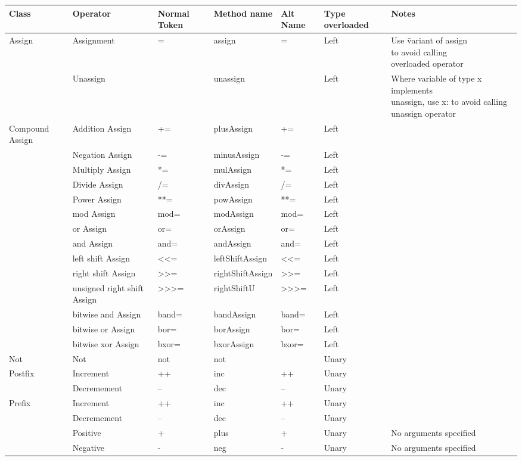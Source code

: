 \documentclass[conc-doc]{subfiles}
\begin{document}
{\tiny
	\begin{longtable}[hbt!]{| l | l | l | l | l | l | l | }
		
		\hline
		Class&Operator&Normal Token&Method name&Alt Name&Type overloaded&Notes\\
		\hline
		\endhead
		
		
		\hline
		
		\endfoot
		Assign&Assignment&=&assign&=&Left&\bettershortstack{Use \= variant of assign\\to avoid calling\\overloaded operator}\\
		&Unassign& &unassign& &Left&\bettershortstack{Where variable of type x implements\\ unassign, use x: to avoid calling unassign operator}\\ \hline
		Compound Assign&Addition Assign&+=&plusAssign&+=&Left&\\
		&Negation Assign&-=&minusAssign&-=&Left&\\
		&Multiply Assign&*=&mulAssign&*=&Left&\\
		&Divide Assign&/=&divAssign&/=&Left&\\
		&Power Assign&**=&powAssign&**=&Left&\\
		&mod Assign&mod=&modAssign&mod=&Left&\\
		&or Assign&or=&orAssign&or=&Left&\\
		&and Assign&and=&andAssign&and=&Left&\\
		&left shift Assign&<<=&leftShiftAssign&<<=&Left&\\
		&right shift Assign&>>=&rightShiftAssign&>>=&Left&\\
		&unsigned right shift Assign&>>>=&rightShiftU&>>>=&Left&\\
		&bitwise and Assign&band=&bandAssign&band=&Left&\\
		&bitwise or Assign&bor=&borAssign&bor=&Left&\\
		&bitwise xor Assign&bxor=&bxorAssign&bxor=&Left&\\ \hline
		Not&Not&not&not& &Unary&\\ \hline
		Postfix&Increment&++&inc&++&Unary&\\
		&Decremement&--&dec&--&Unary&\\ \hline
		Prefix&Increment&++&inc&++&Unary&\\
		&Decremement&--&dec&--&Unary&\\
		&Positive&+&plus&+&Unary&No arguments specified\\
		&Negative&-&neg&-&Unary&No arguments specified\\

\end{longtable}}
\end{document}

